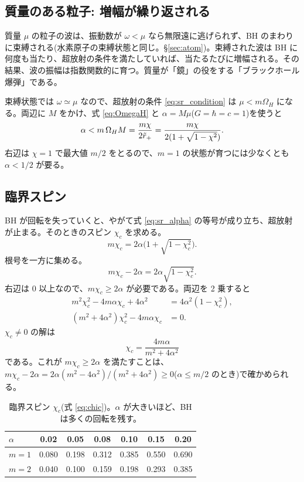 \subsection{質量のある粒子: 増幅が繰り返される}

質量 $\mu$ の粒子の波は、振動数が $\omega<\mu$ なら無限遠に逃げられず、BH のまわりに束縛される(水素原子の束縛状態と同じ。\S\ref{sec:atom})。束縛された波は BH に何度も当たり、超放射の条件を満たしていれば、当たるたびに増幅される。その結果、波の振幅は指数関数的に育つ。質量が「鏡」の役をする「ブラックホール爆弾」である。

束縛状態では $\omega\simeq\mu$ なので、超放射の条件 \eqref{eq:sr_condition} は $\mu<m\Omega_H$ になる。両辺に $M$ をかけ、式 \eqref{eq:OmegaH} と $\alpha=M\mu$($G=\hbar=c=1$)を使うと
\begin{equation}
\alpha<m\,\Omega_HM=\frac{m\chi}{2\tilde r_+}=\frac{m\chi}{2(1+\sqrt{1-\chi^2})}.
\label{eq:sr_alpha}
\end{equation}
右辺は $\chi=1$ で最大値 $m/2$ をとるので、$m=1$ の状態が育つには少なくとも $\alpha<1/2$ が要る。

\subsection{臨界スピン}\label{sec:chic}

BH が回転を失っていくと、やがて式 \eqref{eq:sr_alpha} の等号が成り立ち、超放射が止まる。そのときのスピン $\chi_c$ を求める。
\begin{equation}
m\chi_c=2\alpha\bigl(1+\sqrt{1-\chi_c^2}\bigr).
\end{equation}
根号を一方に集める。
\begin{equation}
m\chi_c-2\alpha=2\alpha\sqrt{1-\chi_c^2}.
\label{eq:chic_step}
\end{equation}
右辺は 0 以上なので、$m\chi_c\ge2\alpha$ が必要である。両辺を 2 乗すると
\begin{align}
m^2\chi_c^2-4m\alpha\chi_c+4\alpha^2&=4\alpha^2(1-\chi_c^2),\\
(m^2+4\alpha^2)\chi_c^2-4m\alpha\chi_c&=0.
\end{align}
$\chi_c\ne0$ の解は
\begin{equation}
\boxed{\;\chi_c=\frac{4m\alpha}{m^2+4\alpha^2}\;}
\label{eq:chic}
\end{equation}
である。これが $m\chi_c\ge2\alpha$ を満たすことは、$m\chi_c-2\alpha=2\alpha(m^2-4\alpha^2)/(m^2+4\alpha^2)\ge0$($\alpha\le m/2$ のとき)で確かめられる。

\begin{table}[H]
\centering\small
\caption{臨界スピン $\chi_c$(式 \ref{eq:chic})。$\alpha$ が大きいほど、BH は多くの回転を残す。}
\label{tab:chic}
\begin{tabular}{@{}lcccccc@{}}
\toprule
$\alpha$ & 0.02 & 0.05 & 0.08 & 0.10 & 0.15 & 0.20 \\
\midrule
$m=1$ & 0.080 & 0.198 & 0.312 & 0.385 & 0.550 & 0.690 \\
$m=2$ & 0.040 & 0.100 & 0.159 & 0.198 & 0.293 & 0.385 \\
\bottomrule
\end{tabular}
\end{table}

